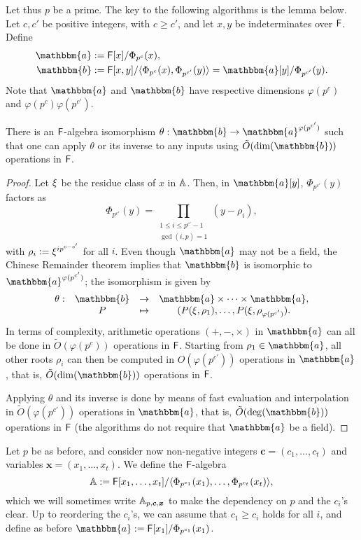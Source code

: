 Let thus $p$ be a prime. The key to the following algorithms is the
lemma below.  Let $c,c'$ be positive integers, with $c \ge
c'$, and let $x,y$ be indeterminates over ${\mathsf{F}}$. Define
\begin{align}
\mathbbm{a}&:=\F[x]/\Phi_{p^c}(x),  \\
\mathbbm{b}&:=\F[x,y]/\langle \Phi_{p^c}(x), \Phi_{p^{c'}}(y)\rangle = \mathbbm{a}[y]/\Phi_{p^{c'}}(y).
\end{align}
Note that $\mathbbm{a}$ and $\mathbbm{b}$ have respective dimensions
$\varphi(p^c)$ and $\varphi(p^c) \varphi(p^{c'})$.
\begin{lemma}
  There is an ${\mathsf{F}}$-algebra isomorphism $\theta: \mathbbm{b} \to
  \mathbbm{a}^{\varphi(p^{c'})}$ such that one can apply $\theta$ or
  its inverse to any inputs using $\tilde{O}(\dim(\mathbbm{b}))$ operations in ${\mathsf{F}}$.
\end{lemma}
\begin{proof}
  Let $\xi$ be the residue class of
  $x$ in $\mathbb{A}$. Then, in $\mathbbm{a}[y]$, $\Phi_{p^{c'}}(y)$ factors as
  $$\Phi_{p^{c'}}(y) =\prod_{\substack{1 \le i\le p^{c'}-1\\ \gcd(i,p)
      =1}} (y-\rho_i),$$ with $\rho_i:={\xi}^{i p^{c-c'}}$ for all
  $i$.  Even though $\mathbbm{a}$ may not be a field, the Chinese
  Remainder theorem implies that $\mathbbm{b}$ is isomorphic to
  $\mathbbm{a}^{\varphi(p^{c'})}$; the isomorphism is given by
  $$\begin{array}{cccc}
    \theta: & \mathbbm{b} & \to & \mathbbm{a} \times \cdots \times \mathbbm{a}, \\
    & P & \mapsto& (P(\xbar,\rho_1),\dots,P(\xbar,\rho_{\varphi(p^{c'})}).
  \end{array}$$
  In terms of complexity, arithmetic operations $(+,-,\times)$ in
  $\mathbbm{a}$ can all be done in $\tilde{O}(\varphi(p^c))$ operations
  in ${\mathsf{F}}$. Starting from $\rho_1 \in \mathbbm{a}$, all other roots
  $\rho_i$ can then be computed in $O(\varphi(p^{c'}))$ operations in
  $\mathbbm{a}$, that is, $\tilde{O}(\dim(\mathbbm{b}))$
  operations in ${\mathsf{F}}$. 
  
Applying $\theta$ and its inverse is done by means of fast evaluation
and interpolation~\citep[Chapter~10]{vzGathen13} in $\tilde{O}(\varphi(p^{c'}))$
operations in $\mathbbm{a}$, that is, $\tilde{O}(\deg(\mathbbm{b}))$ operations in ${\mathsf{F}}$
(the algorithms do not require that $\mathbbm{a}$ be a field).
\end{proof}

\smallskip{}
Let $p$ be as before, and consider now non-negative integers
$\boldsymbol{c}=(c_1,\dots,c_t)$ and variables $\boldsymbol{x}=(x_1,\dots,x_t)$. We
define the ${\mathsf{F}}$-algebra
$$\mathbb{A}:={\mathsf{F}}[x_1,\dots,x_t]/\langle \Phi_{p^{c_1}}(x_1), \dots,
\Phi_{p^{c_t}}(x_t)\rangle,$$ which we will sometimes write
$\mathbb{A}_{p,\boldsymbol{c},\boldsymbol{x}}$ to make the dependency on $p$
and the $c_i$'s clear. Up to reordering the $c_i$'s, we can assume
that $c_1 \ge c_i$ holds for all $i$, and define as before
$\mathbbm{a}:=\F[x_1]/\Phi_{p^{c_1}}(x_1)$.

